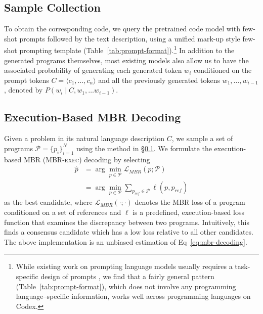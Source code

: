 \documentclass[11pt]{article}
\newcommand{\interalia}[1]{\citep[\textit{inter alia}]{#1}}
\newcommand{\mbrexec}{\textsc{MBR-exec}\xspace}
\begin{document}
\subsection{Sample Collection}
\label{sec:sample-collection}
To obtain the corresponding code, we query the pretrained code model with few-shot prompts followed by the text description, using a unified mark-up style few-shot prompting template (Table~\ref{tab:prompt-format}).\footnote{While existing work on prompting language models usually requires a task-specific design of prompts \interalia{shin-etal-2020-autoprompt,zhong-etal-2021-factual,gao-etal-2021-making}, we find that a fairly general pattern (Table~\ref{tab:prompt-format}), which does not involve any programming language--specific information, works well across programming languages on Codex.} 
In addition to the generated programs themselves, most existing models also allow us to have the associated probability of generating each generated token $w_i$ conditioned on the prompt tokens $C=\langle c_1, \ldots, c_n \rangle$ and all the previously generated tokens $w_1, \ldots, w_{i-1}$, denoted by $P(w_i \mid C, w_1, \ldots w_{i-1})$. 

\subsection{Execution-Based MBR Decoding}
\label{sec:mbr-exec}
Given a problem in its natural language description $C$, we sample a set of programs $\mathcal{P}=\{p_i\}_{i=1}^N$ using the method in \S\ref{sec:sample-collection}. We formulate the execution-based MBR (\mbrexec) decoding by selecting
\begin{align}
\hat{p} &= \arg\min_{p \in \mathcal{P}} \mathcal{L}_\textit{MBR}(p; \mathcal{P}) \nonumber \\
&=\arg\min_{p\in \mathcal{P}} \sum_{p_\textit{ref} \in \mathcal{P}} \ell(p, p_\textit{ref}) \label{eq:mbr-exec-decoding}
\end{align}
as the best candidate, where $\mathcal{L}_\textit{MBR}(\cdot; \cdot)$ denotes the MBR loss of a program conditioned on a set of references and $\ell$ is a predefined, execution-based loss function that examines the discrepancy between two programs. Intuitively, this finds a consensus candidate which has a low loss relative to all other candidates. The above implementation is an unbiased estimation of Eq~\eqref{eq:mbr-decoding}.
\end{document}
